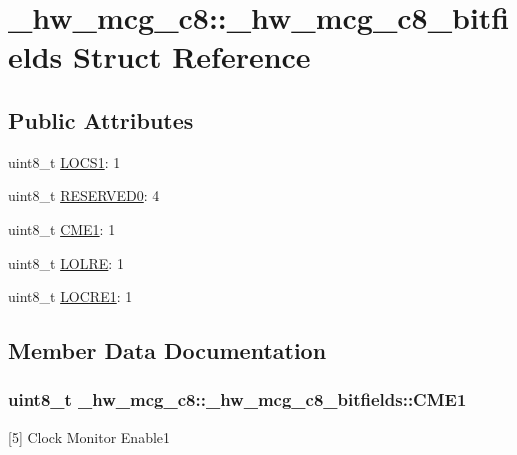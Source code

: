 \hypertarget{struct__hw__mcg__c8_1_1__hw__mcg__c8__bitfields}{}\section{\+\_\+hw\+\_\+mcg\+\_\+c8\+:\+:\+\_\+hw\+\_\+mcg\+\_\+c8\+\_\+bitfields Struct Reference}
\label{struct__hw__mcg__c8_1_1__hw__mcg__c8__bitfields}
\subsection*{Public Attributes}
\begin{DoxyCompactItemize}
\item 
uint8\+\_\+t \hyperlink{struct__hw__mcg__c8_1_1__hw__mcg__c8__bitfields_a71cb799e69d12b5ae9274085058dd583}{L\+O\+C\+S1}\+: 1
\item 
uint8\+\_\+t \hyperlink{struct__hw__mcg__c8_1_1__hw__mcg__c8__bitfields_a0eafe2cf15afaf73c05251d50ac13985}{R\+E\+S\+E\+R\+V\+E\+D0}\+: 4
\item 
uint8\+\_\+t \hyperlink{struct__hw__mcg__c8_1_1__hw__mcg__c8__bitfields_a03fe41444ab35aa53616c052d1e7375f}{C\+M\+E1}\+: 1
\item 
uint8\+\_\+t \hyperlink{struct__hw__mcg__c8_1_1__hw__mcg__c8__bitfields_a15f7c1bd85c29c1bc83cb6904dce68bc}{L\+O\+L\+RE}\+: 1
\item 
uint8\+\_\+t \hyperlink{struct__hw__mcg__c8_1_1__hw__mcg__c8__bitfields_a7c95cb944c9cc5303bc7ba003741d664}{L\+O\+C\+R\+E1}\+: 1
\end{DoxyCompactItemize}


\subsection{Member Data Documentation}
\subsubsection[{\texorpdfstring{C\+M\+E1}{CME1}}]{\setlength{\rightskip}{0pt plus 5cm}uint8\+\_\+t \+\_\+hw\+\_\+mcg\+\_\+c8\+::\+\_\+hw\+\_\+mcg\+\_\+c8\+\_\+bitfields\+::\+C\+M\+E1}\hypertarget{struct__hw__mcg__c8_1_1__hw__mcg__c8__bitfields_a03fe41444ab35aa53616c052d1e7375f}{}\label{struct__hw__mcg__c8_1_1__hw__mcg__c8__bitfields_a03fe41444ab35aa53616c052d1e7375f}
\mbox{[}5\mbox{]} Clock Monitor Enable1 
